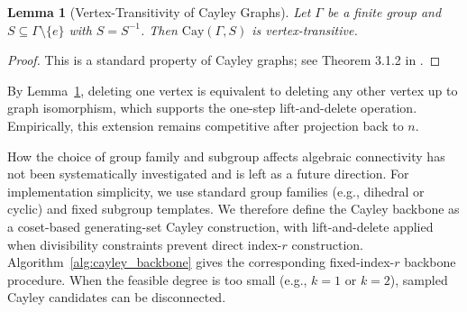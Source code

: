 \documentclass[letterpaper, 10 pt, conference]{ieeeconf}  %
\newtheorem{lemma}{Lemma}
\newcommand{\1}{\mathbf{1}}
\newcommand{\0}{\mathbf{0}}
\begin{document}
\begin{lemma}[Vertex-Transitivity of Cayley Graphs]
\label{lem:cayley_vertex_transitive}
Let \(\Gamma\) be a finite group and \(S\subseteq \Gamma\setminus\{e\}\) with \(S=S^{-1}\).
Then \(\mathrm{Cay}(\Gamma,S)\) is vertex-transitive.
\end{lemma}
\begin{proof}
This is a standard property of Cayley graphs; see Theorem 3.1.2 in \cite{godsil_royle_agt_2001}.
\end{proof}
By Lemma~\ref{lem:cayley_vertex_transitive}, deleting one vertex is equivalent to deleting any other vertex up to graph isomorphism, which supports the one-step lift-and-delete operation.
Empirically, this extension remains competitive after projection back to \(n\).

How the choice of group family and subgroup affects algebraic connectivity has not been systematically investigated and is left as a future direction.
For implementation simplicity, we use standard group families (e.g., dihedral or cyclic) and fixed subgroup templates.
We therefore define the Cayley backbone as a coset-based generating-set Cayley construction, with lift-and-delete applied when divisibility constraints prevent direct index-\(r\) construction.
Algorithm~\ref{alg:cayley_backbone} gives the corresponding fixed-index-\(r\) backbone procedure.
When the feasible degree is too small (e.g., \(k=1\) or \(k=2\)), sampled Cayley candidates can be disconnected.
\end{document}

